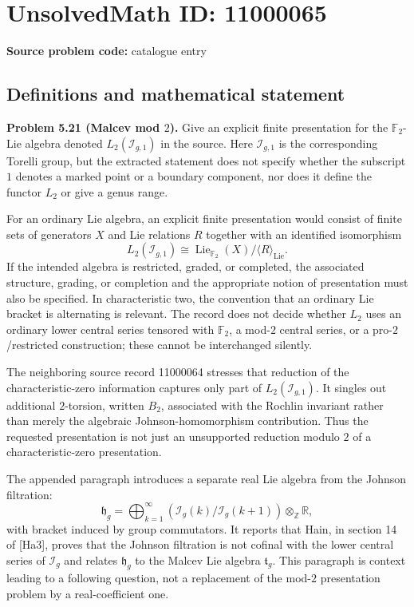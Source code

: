 \documentclass[11pt]{article}
\newcommand{\Z}{\mathbb{Z}}
\newcommand{\R}{\mathbb{R}}
\newcommand{\F}{\mathbb{F}}
\begin{document}
\section*{UnsolvedMath ID: 11000065}
\textbf{Source problem code:} catalogue entry
\subsection{Definitions and mathematical statement}
\textbf{Problem 5.21 (Malcev mod $2$).} Give an explicit finite presentation for the $\F_2$-Lie algebra denoted $L_2(\mathcal I_{g,1})$ in the source. Here $\mathcal I_{g,1}$ is the corresponding Torelli group, but the extracted statement does not specify whether the subscript $1$ denotes a marked point or a boundary component, nor does it define the functor $L_2$ or give a genus range.

For an ordinary Lie algebra, an explicit finite presentation would consist of finite sets of generators $X$ and Lie relations $R$ together with an identified isomorphism
\[
 L_2(\mathcal I_{g,1})\cong\operatorname{Lie}_{\F_2}(X)/\langle R\rangle_{\mathrm{Lie}}.
\]
If the intended algebra is restricted, graded, or completed, the associated structure, grading, or completion and the appropriate notion of presentation must also be specified. In characteristic two, the convention that an ordinary Lie bracket is alternating is relevant. The record does not decide whether $L_2$ uses an ordinary lower central series tensored with $\F_2$, a mod-$2$ central series, or a pro-$2$/restricted construction; these cannot be interchanged silently.

The neighboring source record 11000064 stresses that reduction of the characteristic-zero information captures only part of $L_2(\mathcal I_{g,1})$. It singles out additional $2$-torsion, written $B_2$, associated with the Rochlin invariant rather than merely the algebraic Johnson-homomorphism contribution. Thus the requested presentation is not just an unsupported reduction modulo $2$ of a characteristic-zero presentation.

The appended paragraph introduces a separate real Lie algebra from the Johnson filtration:
\[
 \mathfrak h_g=\bigoplus_{k=1}^{\infty}
 \left(\mathcal I_g(k)/\mathcal I_g(k+1)\right)\otimes_{\Z}\R,
\]
with bracket induced by group commutators. It reports that Hain, in section 14 of [Ha3], proves that the Johnson filtration is not cofinal with the lower central series of $\mathcal I_g$ and relates $\mathfrak h_g$ to the Malcev Lie algebra $\mathfrak t_g$. This paragraph is context leading to a following question, not a replacement of the mod-$2$ presentation problem by a real-coefficient one.
\end{document}
